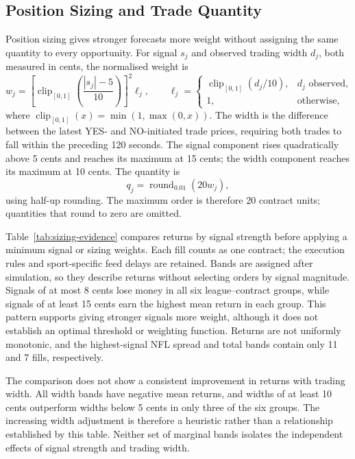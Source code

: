 \documentclass[12pt,a4paper,oneside]{report}
\begin{document}
\subsection{Position Sizing and Trade Quantity}\label{sec:position-sizing}
Position sizing gives stronger forecasts more weight without assigning the
same quantity to every opportunity. For signal $s_j$ and observed trading width
$d_j$, both measured in cents, the normalised weight is
\begin{equation}
 w_j=\left[\operatorname{clip}_{[0,1]}\!\left(\frac{|s_j|-5}{10}\right)\right]^2
 \ell_j,\qquad
 \ell_j=\begin{cases}
 \operatorname{clip}_{[0,1]}(d_j/10), & d_j\text{ observed},\\
 1, & \text{otherwise},
 \end{cases}
\end{equation}
where $\operatorname{clip}_{[0,1]}(x)=\min(1,\max(0,x))$.
The width is the difference between the latest YES- and NO-initiated trade
prices, requiring both trades to fall within the preceding 120 seconds.
The signal component rises quadratically above 5 cents and reaches its maximum
at 15 cents; the width component reaches its maximum at 10 cents. The quantity is
\begin{equation}
 q_j=\operatorname{round}_{0.01}(20w_j),
\end{equation}
using half-up rounding. The maximum order is therefore 20 contract units;
quantities that round to zero are omitted.

Table~\ref{tab:sizing-evidence} compares returns by signal strength before
applying a minimum signal or sizing weights. Each fill counts as one contract;
the execution rules and sport-specific feed delays are retained. Bands are
assigned after simulation, so they describe returns without selecting orders
by signal magnitude. Signals of at most 8 cents lose money in all six
league--contract groups, while signals of at least 15 cents earn the highest
mean return in each group. This pattern supports giving stronger signals more
weight, although it does not establish an optimal threshold or weighting
function. Returns are not uniformly monotonic, and the highest-signal NFL
spread and total bands contain only 11 and 7 fills, respectively.

The comparison does not show a consistent improvement in returns with
trading width. All width bands have negative mean returns, and widths of at
least 10 cents outperform widths below 5 cents in only three of the six
groups. The increasing width adjustment is therefore a heuristic rather than
a relationship established by this table. Neither set of marginal bands
isolates the independent effects of signal strength and trading width.
\end{document}
